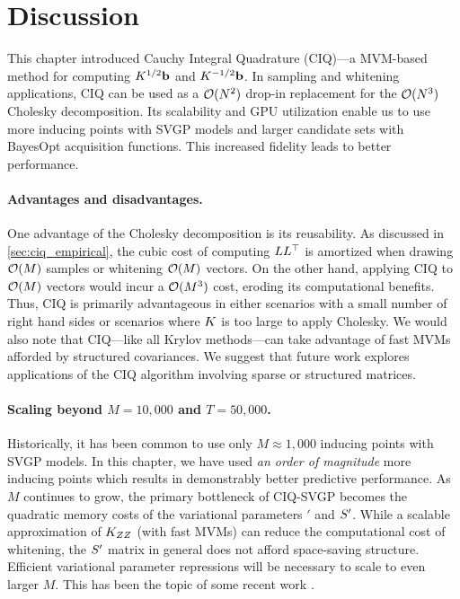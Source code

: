 \section{Discussion}

This chapter introduced Cauchy Integral Quadrature (CIQ)---a MVM-based method for computing $K^{1/2} \mathbf{b}$ and $K^{-1/2} \mathbf{b}$.
In sampling and whitening applications, CIQ can be used as a $\bigo{N^2}$ drop-in replacement for the $\bigo{N^3}$ Cholesky decomposition.
Its scalability and GPU utilization enable us to use more inducing points with SVGP models and larger candidate sets with BayesOpt acquisition functions.
This increased fidelity leads to better performance.


\paragraph{Advantages and disadvantages.}
One advantage of the Cholesky decomposition is its reusability.
As discussed in \cref{sec:ciq_empirical}, the cubic cost of computing $L L^\top$ is amortized when drawing $\bigo{M}$ samples or whitening $\bigo{M}$ vectors.
On the other hand, applying CIQ to $\bigo{M}$ vectors would incur a $\bigo{M^3}$ cost, eroding its computational benefits. Thus, CIQ is primarily advantageous
in either scenarios with a small number of right hand sides or scenarios where $K$ is too large to apply Cholesky.
We would also note that CIQ---like all Krylov methods---can take advantage of fast MVMs afforded by structured covariances.
We suggest that future work explores applications of the CIQ algorithm involving sparse or structured matrices.


\paragraph{Scaling beyond $M=10,\!000$ and $T=50,\!000$.}
Historically, it has been common to use only $M\approx1,\!000$ inducing points with SVGP models.
In this chapter, we have used \emph{an order of magnitude} more inducing points which results in demonstrably better predictive performance.
As $M$ continues to grow, the primary bottleneck of CIQ-SVGP becomes the quadratic memory costs of the variational parameters $\bm'$ and $S'$.
While a scalable approximation of $K_{ZZ}$ (with fast MVMs) can reduce the computational cost of whitening, the $S'$ matrix in general does not afford space-saving structure.
Efficient variational parameter repressions will be necessary to scale to even larger $M$.
This has been the topic of some recent work \cite{wilson2016stochastic,cheng2017variational,salimbeni2018orthogonally,shi2019sparse}.

